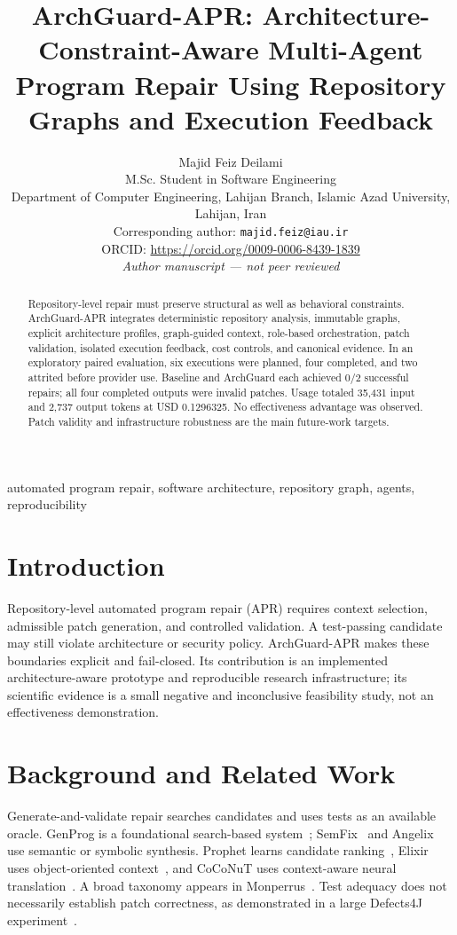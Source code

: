 \documentclass[10pt,journal]{IEEEtran}
\title{ArchGuard-APR: Architecture-Constraint-Aware Multi-Agent Program Repair Using Repository Graphs and Execution Feedback}
\author{Majid Feiz Deilami\\
M.Sc. Student in Software Engineering\\
Department of Computer Engineering, Lahijan Branch, Islamic Azad University, Lahijan, Iran\\
Corresponding author: \texttt{majid.feiz@iau.ir}\\
ORCID: \url{https://orcid.org/0009-0006-8439-1839}\\
\emph{Author manuscript --- not peer reviewed}}
\begin{document}
\maketitle
\begin{abstract}
Repository-level repair must preserve structural as well as behavioral constraints. ArchGuard-APR
integrates deterministic repository analysis, immutable graphs, explicit architecture profiles,
graph-guided context, role-based orchestration, patch validation, isolated execution feedback, cost
controls, and canonical evidence. In an exploratory paired evaluation, six executions were planned,
four completed, and two attrited before provider use. Baseline and ArchGuard each achieved 0/2
successful repairs; all four completed outputs were invalid patches. Usage totaled 35,431 input and
2,737 output tokens at USD 0.1296325. No effectiveness advantage was observed. Patch validity and
infrastructure robustness are the main future-work targets.
\end{abstract}
\begin{IEEEkeywords}automated program repair, software architecture, repository graph, agents, reproducibility\end{IEEEkeywords}

\section{Introduction}
Repository-level automated program repair (APR) requires context selection, admissible patch
generation, and controlled validation. A test-passing candidate may still violate architecture or
security policy. ArchGuard-APR makes these boundaries explicit and fail-closed. Its contribution is an
implemented architecture-aware prototype and reproducible research infrastructure; its scientific
evidence is a small negative and inconclusive feasibility study, not an effectiveness demonstration.

\section{Background and Related Work}
Generate-and-validate repair searches candidates and uses tests as an available oracle. GenProg is a
foundational search-based system~\cite{LeGoues2012GenProg}; SemFix~\cite{Nguyen2013SemFix} and
Angelix~\cite{Mechtaev2016Angelix} use semantic or symbolic synthesis. Prophet learns candidate
ranking~\cite{Long2016Prophet}, Elixir uses object-oriented context~\cite{Ye2017Elixir}, and CoCoNuT
uses context-aware neural translation~\cite{Lutellier2020CoCoNuT}. A broad taxonomy appears in
Monperrus~\cite{Monperrus2018Bibliography}. Test adequacy does not necessarily establish patch
correctness, as demonstrated in a large Defects4J experiment~\cite{Martinez2017Astor}.
\end{document}
